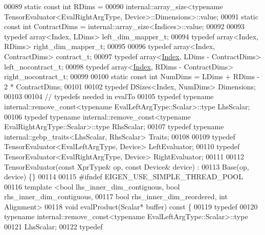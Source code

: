 \begin{DoxyCode}
00089   \textcolor{keyword}{static} \textcolor{keyword}{const} \textcolor{keywordtype}{int} RDims =
00090       internal::array\_size<typename TensorEvaluator<EvalRightArgType, Device>::Dimensions>::value;
00091   \textcolor{keyword}{static} \textcolor{keyword}{const} \textcolor{keywordtype}{int} ContractDims = internal::array\_size<Indices>::value;
00092 
00093   \textcolor{keyword}{typedef} array<Index, LDims> left\_dim\_mapper\_t;
00094   \textcolor{keyword}{typedef} array<Index, RDims> right\_dim\_mapper\_t;
00095 
00096   \textcolor{keyword}{typedef} array<Index, ContractDims> contract\_t;
00097   \textcolor{keyword}{typedef} array<\hyperlink{namespace_eigen_a62e77e0933482dafde8fe197d9a2cfde}{Index}, LDims - ContractDims> left\_nocontract\_t;
00098   \textcolor{keyword}{typedef} array<\hyperlink{namespace_eigen_a62e77e0933482dafde8fe197d9a2cfde}{Index}, RDims - ContractDims> right\_nocontract\_t;
00099 
00100   \textcolor{keyword}{static} \textcolor{keyword}{const} \textcolor{keywordtype}{int} NumDims = LDims + RDims - 2 * ContractDims;
00101 
00102   \textcolor{keyword}{typedef} DSizes<Index, NumDims> Dimensions;
00103 
00104   \textcolor{comment}{// typedefs needed in evalTo}
00105   \textcolor{keyword}{typedef} \textcolor{keyword}{typename} internal::remove\_const<typename EvalLeftArgType::Scalar>::type LhsScalar;
00106   \textcolor{keyword}{typedef} \textcolor{keyword}{typename} internal::remove\_const<typename EvalRightArgType::Scalar>::type RhsScalar;
00107   \textcolor{keyword}{typedef} \textcolor{keyword}{typename} internal::gebp\_traits<LhsScalar, RhsScalar> Traits;
00108 
00109   \textcolor{keyword}{typedef} TensorEvaluator<EvalLeftArgType, Device> LeftEvaluator;
00110   \textcolor{keyword}{typedef} TensorEvaluator<EvalRightArgType, Device> RightEvaluator;
00111 
00112   TensorEvaluator(\textcolor{keyword}{const} XprType& op, \textcolor{keyword}{const} Device& device) :
00113       Base(op, device) \{\}
00114 
00115 \textcolor{preprocessor}{#ifndef EIGEN\_USE\_SIMPLE\_THREAD\_POOL}
00116   \textcolor{keyword}{template} <\textcolor{keywordtype}{bool} lhs\_inner\_dim\_contiguous, \textcolor{keywordtype}{bool} rhs\_inner\_dim\_contiguous,
00117             \textcolor{keywordtype}{bool} rhs\_inner\_dim\_reordered, \textcolor{keywordtype}{int} Alignment>
00118   \textcolor{keywordtype}{void} evalProduct(Scalar* buffer)\textcolor{keyword}{ const }\{
00119     \textcolor{keyword}{typedef}
00120         \textcolor{keyword}{typename} internal::remove\_const<typename EvalLeftArgType::Scalar>::type
00121             LhsScalar;
00122     \textcolor{keyword}{typedef}

\end{DoxyCode}
